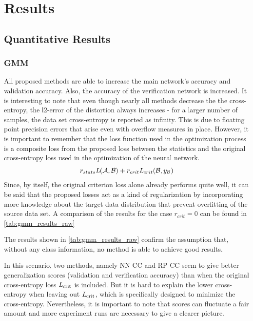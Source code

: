 \section{Results}

\subsection{Quantitative Results}

\subsubsection{GMM}

All proposed methods are able to increase the main network's accuracy and validation accuracy.
Also, the accuracy of the verification network is increased.
It is interesting to note that even though nearly all methods decrease the 
the cross-entropy, the l2-error of the distortion always increases
- for a larger number of samples, the data set cross-entropy is reported as infinity.
This is due to floating point precision errors that arise even with overflow measures in place.
However, it is important to remember that the loss function used in the optimization process
is a composite loss from the proposed loss between the statistics
and the original cross-entropy loss used in the optimization of the neural network.
\[
    r_{stats} \textit{L}(\mathcal A, \mathcal B) + r_{crit}\textit{L}_{crit}(\mathcal B, y_{\mathcal B})
\]
Since, by itself, the original criterion loss alone already performs quite well, 
it can be said that the proposed losses act as a kind of regularization 
by incorporating more knowledge about the target data distribution that prevent overfitting
of the source data set.
A comparison of the results for the case $r_{crit}=0$ can be found in \cref{tab:gmm_results_raw}

The results shown in \cref{tab:gmm_results_raw} confirm the assumption that,
without any class information, no method is able to achieve good results.

In this scenario, two methods, namely NN CC and RP CC seem to give 
better generalization scores 
(validation and verification accuracy) than when the original cross-entropy loss 
$\textit{L}_\text{crit}$ is included.
But it is hard to explain the lower cross-entropy when leaving out 
$\textit{L}_\text{crit}$, which is specifically designed to minimize the cross-entropy.
Nevertheless, it is important to note that scores can fluctuate a fair amount and more 
experiment runs are necessary to give a clearer picture.


